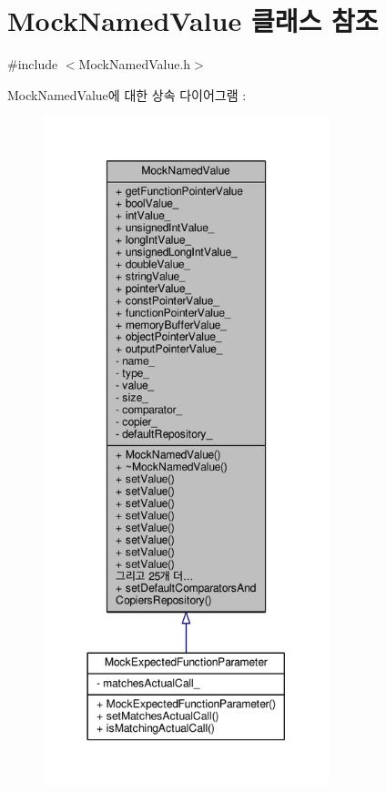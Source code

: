 \hypertarget{class_mock_named_value}{}\section{Mock\+Named\+Value 클래스 참조}
\label{class_mock_named_value}


{\ttfamily \#include $<$Mock\+Named\+Value.\+h$>$}



Mock\+Named\+Value에 대한 상속 다이어그램 \+: 
\nopagebreak
\begin{figure}[H]
\begin{center}
\leavevmode
\includegraphics[height=550pt]{class_mock_named_value__inherit__graph}
\end{center}
\end{figure}


